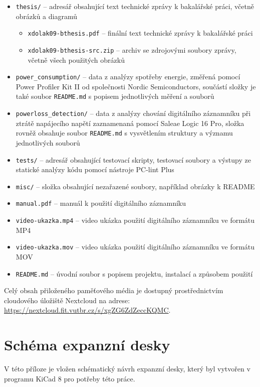 \begin{itemize}
    
    \item \texttt{thesis/} -- adresář obsahující text technické zprávy k bakalářské práci, včetně obrázků a diagramů

    \begin{itemize}
        \item \texttt{xdolak09-bthesis.pdf} -- finální text technické zprávy k bakalářské práci
        \item \texttt{xdolak09-bthesis-src.zip} -- archiv se zdrojovými soubory zprávy, včetně všech použitých obrázků
    \end{itemize}
    
    
    \item \texttt{power\_consumption/} -- data z analýzy spotřeby energie, změřená pomocí Power Profiler Kit II od společnosti Nordic Semiconductors, součástí složky je také soubor \texttt{README.md} s popisem jednotlivých měření a souborů

    \item \texttt{powerloss\_detection/} -- data z analýzy chování digitálního záznamníku při ztrátě napájecího napětí zaznamenaná pomocí Saleae Logic 16 Pro, složka rovněž obsahuje soubor \texttt{README.md} s vysvětlením struktury a významu jednotlivých souborů
    
    \item \texttt{tests/} -- adresář obsahující testovací skripty, testovací soubory a výstupy ze statické analýzy kódu pomocí nástroje PC-lint Plus

    \item \texttt{misc/} -- složka obsahující nezařazené soubory, například obrázky k README

    \item \texttt{manual.pdf} -- manuál k použití digitálního záznamníku
    \item \texttt{video-ukazka.mp4} -- video ukázka použití digitálního záznamníku ve formátu MP4
    \item \texttt{video-ukazka.mov} -- video ukázka použití digitálního záznamníku ve formátu MOV
    \item \texttt{README.md} -- úvodní soubor s popisem projektu, instalací a způsobem použití
\end{itemize}

Celý obsah přiloženého paměťového média je dostupný prostřednictvím cloudového úložiště Nextcloud na adrese: \url{https://nextcloud.fit.vutbr.cz/s/xgZG6ZdZeccKQMC}.

\chapter{Schéma expanzní desky}
\vspace{-2em}
V této příloze je vložen schématický návrh expanzní desky, který byl vytvořen v programu KiCad 8 pro potřeby této práce.

